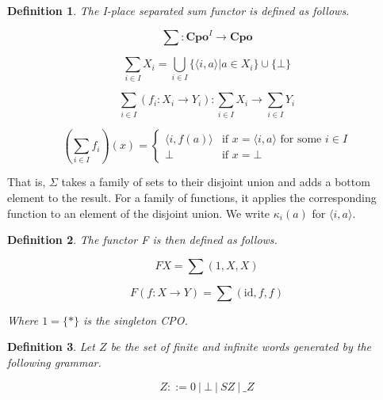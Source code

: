 \documentclass[a4paper]{article}
\newcommand{\arr}{\rightarrow}
\newtheorem{defNuF}{Definition}[section]
\newtheorem{defNplaceSeparatedSum}[defNuF]{Definition}
\newtheorem{defF}[defNuF]{Definition}
\begin{document}
\begin{defNplaceSeparatedSum}

The I-place separated sum functor is defined as follows.

\begin{equation}
\sum : \mathbf{Cpo}^I \arr \mathbf{Cpo} \nonumber
\end{equation}

\begin{equation}
\sum_{i \in I}{X_i} =
  \bigcup_{i \in I} \{ \langle i, a \rangle | a \in X_i \}
  \cup \{ \bot \} \nonumber
\end{equation}

\begin{equation}
\sum_{i \in I}{(f_i : X_i \arr Y_i)} :
  \sum_{i \in I}{X_i} \arr \sum_{i \in I}{Y_i} \nonumber
\end{equation}

\begin{equation*}
( \sum_{i \in I}f_i ) (x) = \left\{
  \begin{array}{rl}
     \langle i, f(a) \rangle & \text{if } x = \langle i, a \rangle
                               \text{ for some } i \in I \\
    \bot                     & \text{if } x = \bot
  \end{array} \right.
\end{equation*}

\end{defNplaceSeparatedSum}

That is, $\Sigma$ takes a family of sets to their disjoint union and adds a bottom
element to the result.  For a family of functions, it applies the corresponding
function to an element of the disjoint union.  We write $\kappa_i(a)$ for
$\langle i, a \rangle$.

\begin{defF}

The functor F is then defined as follows.

\begin{equation*}
FX = \sum{(1, X, X)}
\end{equation*}

\begin{equation*}
F(f : X \arr Y) = \sum{(\text{id}, f, f)}
\end{equation*}

Where $1 = \{*\}$ is the singleton CPO.

\end{defF}


\begin{defNuF}

Let $Z$ be the set of finite and infinite words generated by the following
grammar.

\begin{equation*}
Z ::= 0 \ |\ \bot \ |\ S Z \ |\ \_ Z
\end{equation*}

\end{defNuF}
\end{document}
